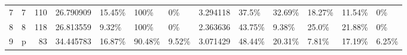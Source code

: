 \begin{tabular}{llrrlllrlllll}
7 &  7 &      110 &   26.790909 &              15.45\% &                                       100\% &                                               0\% &                3.294118 &        37.5\% &         32.69\% &               18.27\% &             11.54\% &           0\% \\
8 &  8 &      118 &   26.813559 &               9.32\% &                                       100\% &                                               0\% &                2.363636 &       43.75\% &          9.38\% &                25.0\% &             21.88\% &           0\% \\
9 &  p &       83 &   34.445783 &              16.87\% &                                     90.48\% &                                            9.52\% &                3.071429 &       48.44\% &         20.31\% &                7.81\% &             17.19\% &        6.25\% \\
\bottomrule
\end{tabular}
